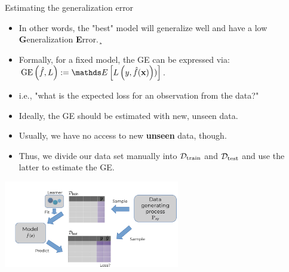 \documentclass[11pt,compress,t,notes=noshow, xcolor=table]{beamer}
\begin{document}
\begin{vbframe}{Estimating the generalization error}
\begin{itemize}
\item In other words, the "best" model will generalize well and have a low \textbf{G}eneralization \textbf{E}rror.¸
\item Formally, for a fixed model, the GE can be expressed via: $\GEfL := \E \left[ \Lyfhx) \right]$.
\item i.e., "what is the expected loss for an observation from the data?"
\item Ideally, the GE should be estimated with new, unseen data.
\item Usually, we have no access to new \textbf{unseen} data, though.
\item Thus, we divide our data set manually into $\mathcal{D}_{\text{train}}$ and $\mathcal{D}_{\text{test}}$ and use the latter to estimate the GE.
\end{itemize}

\begin{center}
\includegraphics[trim = 0 0 0 30, clip, width=0.575\textwidth]
{figure_man/evaluation-intro-ge.pdf}
\end{center}

\end{vbframe}
\end{document}
